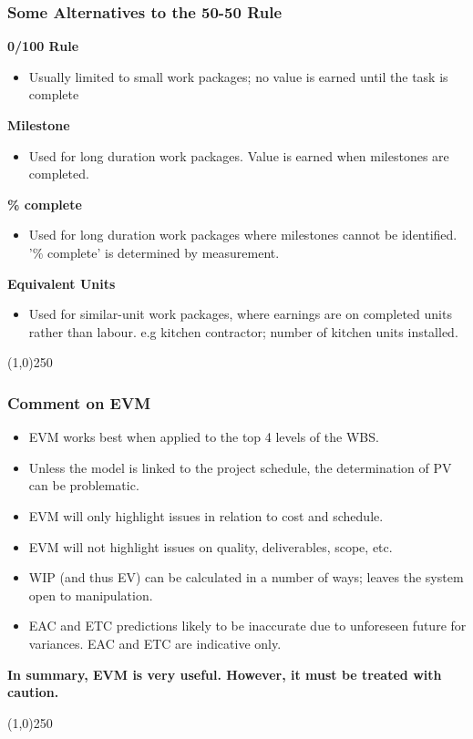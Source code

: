 \begin{frame}
\frametitle{Some Alternatives to the 50-50 Rule}
\textbf{0/100 Rule}
\begin{itemize}
	\item Usually limited to small work packages; no value is earned until the task is complete
\end{itemize}
\textbf{Milestone}
\begin{itemize}
	\item Used for long duration work packages.  Value is earned when milestones are completed.
\end{itemize}
\textbf{\% complete}
\begin{itemize}
	\item Used for long duration work packages where milestones cannot be identified.  '\% complete' is determined by measurement.
\end{itemize}
\textbf{Equivalent Units}
\begin{itemize}
	\item Used for similar-unit work packages, where earnings are on completed units rather than labour.  e.g kitchen contractor; number of kitchen units installed.
\end{itemize}
\end{frame}
\begin{center}\line(1,0){250}\end{center}





\begin{frame}
\frametitle{Comment on EVM}
\begin{itemize}
	\item EVM works best when applied to the top 4 levels of the WBS.
	\item Unless the model is linked to the project schedule, the determination of PV can be problematic.
	\item EVM will only highlight issues in relation to cost and schedule.
	\item EVM will not highlight issues on quality, deliverables, scope, etc.
	\item WIP (and thus EV) can be calculated in a number of ways; leaves the system open to manipulation. 
	\item EAC and ETC predictions likely to be inaccurate due to unforeseen future for variances.  EAC and ETC are indicative only.
\end{itemize}
\textbf{In summary, EVM is very useful.  However, it must be treated with caution.}  
\end{frame}
\begin{center}\line(1,0){250}\end{center}




 